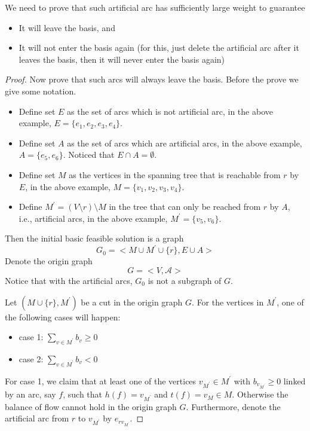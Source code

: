 				We need to prove that such artificial arc has sufficiently large weight to guarantee
				\begin{itemize}
					\item It will leave the basis, and
					\item It will not enter the basis again (for this, just delete the artificial arc after it leaves the basis, then it will never enter the basis again)
				\end{itemize}
				\begin{proof}
					Now prove that such arcs will always leave the basis. Before the prove we give some notation. 
					\begin{itemize}
						\item Define set $E$ as the set of arcs which is not artificial arc, in the above example, $E = \{e_1, e_2, e_3, e_4\}$. 
						\item Define set $A$ as the set of arcs which are artificial arcs, in the above example, $A = \{e_5, e_6\}$. Noticed that $E \cap A = \emptyset$.
						\item Define set $M$ as the vertices in the spanning tree that is reachable from $r$ by $E$, in the above example, $M = \{v_1, v_2, v_3, v_4\}$.
						\item Define $M^\prime = (V\setminus r) \setminus M$ in the tree that can only be reached from $r$ by $A$, i.e., artificial arcs, in the above example, $M^\prime = \{v_5, v_6\}$. 
					\end{itemize}

					Then the initial basic feasible solution is a graph 
					\begin{equation}
						G_0 = <M\cup M^\prime \cup \{r\}, E\cup A>
					\end{equation}
					Denote the origin graph 
					\begin{equation}
						G = <V, \mathcal{A}>
					\end{equation}
					Notice that with the artificial arcs, $G_0$ is not a subgraph of $G$.

					Let $(M\cup\{r\}, M^\prime)$ be a cut in the origin graph $G$. For the vertices in $M^\prime$, one of the following cases will happen:
					\begin{itemize}
						\item case 1: $\sum_{v \in M^\prime} b_v \ge 0$
						\item case 2: $\sum_{v \in M^\prime} b_v < 0$
					\end{itemize}

					For case 1, we claim that at least one of the vertices $v_{M^\prime} \in M^\prime$ with $b_{v_{M^\prime}} \ge 0$ linked by an arc, say $f$, such that $h(f) = v_{M^\prime}$ and $t(f) = v_M \in M$. Otherwise the balance of flow cannot hold in the origin graph $G$. Furthermore, denote the artificial arc from $r$ to $v_{M^\prime}$ by $e_{rv_{M^\prime}}$.


\end{proof}
